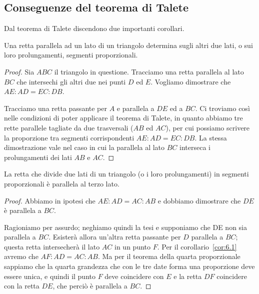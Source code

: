 \subsection{Conseguenze del teorema di Talete}

Dal teorema di Talete discendono due importanti corollari.
\begin{corollario}\label{cor:6.1}
Una retta parallela ad un lato di un triangolo determina sugli altri 
due lati, o sui loro prolungamenti, segmenti proporzionali.
\end{corollario}

\begin{figure*}[!htb]
	\centering	
\end{figure*}

\begin{proof}
Sia \(ABC\) il triangolo in questione. Tracciamo una retta parallela al 
lato \(BC\) che intersechi gli altri due nei punti \(D\) ed \(E\). Vogliamo 
dimostrare che \(AE : AD = EC : DB\).

Tracciamo una retta passante per \(A\) e parallela a \(DE\) ed a \(BC\). Ci 
troviamo così nelle condizioni di poter applicare il teorema di 
Talete, in quanto abbiamo tre rette parallele tagliate da due 
trasversali (\(AB\) ed \(AC\)), per cui possiamo scrivere la proporzione 
tra segmenti corrispondenti \(AE : AD = EC : DB\).
La stessa dimostrazione vale nel caso in cui la parallela al lato 
\(BC\) interseca i prolungamenti dei lati \(AB\) e \(AC\).
\end{proof}

\begin{corollario}\label{cor:6.2}
La retta che divide due lati di un triangolo (o i loro prolungamenti) 
in segmenti proporzionali è parallela al terzo lato.
\end{corollario}

\begin{figure*}[!htb]
	\centering	
\end{figure*}

\begin{proof}
Abbiamo in ipotesi che \(AE : AD = AC : AB\) e dobbiamo dimostrare che 
\(DE\) è parallela a \(BC\).

Ragioniamo per assurdo; neghiamo quindi la tesi e supponiamo che DE 
non sia parallela a \(BC\). Esisterà allora un'altra retta passante per 
\(D\) parallela a \(BC\); questa retta intersecherà il lato \(AC\) in un 
punto \(F\). Per il corollario~\ref{cor:6.1} avremo che \(AF : AD = AC : 
AB\).
Ma per il teorema della quarta proporzionale sappiamo che la quarta 
grandezza che con le tre date forma una proporzione deve essere 
unica, e quindi il punto \(F\) deve coincidere con \(E\) e la retta \(DF\) 
coincidere con la retta \(DE\), che perciò è parallela a \(BC\).
\end{proof}

